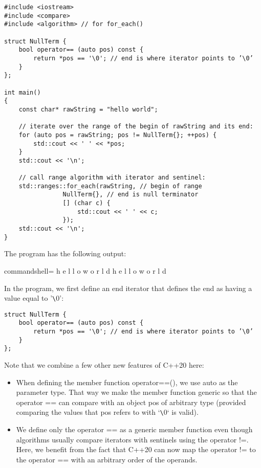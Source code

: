 \begin{lstlisting}[style=styleCXX]
#include <iostream>
#include <compare>
#include <algorithm> // for for_each()

struct NullTerm {
	bool operator== (auto pos) const {
		return *pos == '\0'; // end is where iterator points to ’\0’
	}
};

int main()
{
	const char* rawString = "hello world";
	
	// iterate over the range of the begin of rawString and its end:
	for (auto pos = rawString; pos != NullTerm{}; ++pos) {
		std::cout << ' ' << *pos;
	}
	std::cout << '\n';
	
	// call range algorithm with iterator and sentinel:
	std::ranges::for_each(rawString, // begin of range
				NullTerm{}, // end is null terminator
				[] (char c) {
					std::cout << ' ' << c;
				});
	std::cout << '\n';
}
\end{lstlisting}

The program has the following output:

\begin{tcblisting}{commandshell={}}
h e l l o   w o r l d
h e l l o   w o r l d
\end{tcblisting}

In the program, we first define an end iterator that defines the end as having a value equal to ’\verb|\|0’:

\begin{lstlisting}[style=styleCXX]
struct NullTerm {
	bool operator== (auto pos) const {
		return *pos == '\0'; // end is where iterator points to ’\0’
	}
};
\end{lstlisting}

Note that we combine a few other new features of C++20 here:

\begin{itemize}
\item
When defining the member function operator==(), we use auto as the parameter type. That way we make the member function generic so that the operator == can compare with an object pos of arbitrary type (provided comparing the values that pos refers to with ‘\verb|\|0‘ is valid).

\item
We define only the operator == as a generic member function even though algorithms usually compare iterators with sentinels using the operator !=. Here, we benefit from the fact that C++20 can now map the operator != to the operator == with an arbitrary order of the operands.
\end{itemize}

